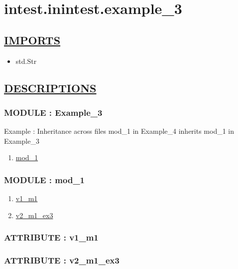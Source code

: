 \chapter*{intest.inintest.example\_3}

\section*{\underline{IMPORTS}}
\begin{itemize}
\item std.Str
\end{itemize}

\section*{\underline{DESCRIPTIONS}}
\subsection*{MODULE : Example\_3}
\hypertarget{ecldoc:intest.inintest.example_3_intest.inintest.Example_3}{}
Example : Inheritance across files mod\_1 in Example\_4 inherits mod\_1 in Example\_3 \\
\begin{enumerate}
\item \hyperlink{ecldoc:intest.inintest.example_3_intest.inintest.Example_3.mod_1}{mod\_1}
\end{enumerate}
\subsection*{MODULE : mod\_1}
\hypertarget{ecldoc:intest.inintest.example_3_intest.inintest.Example_3.mod_1}{}
\begin{enumerate}
\item \hyperlink{ecldoc:intest.inintest.example_3_intest.inintest.example_3.mod_1.v1_m1}{v1\_m1}
\item \hyperlink{ecldoc:intest.inintest.example_3_intest.inintest.example_3.mod_1.v2_m1_ex3}{v2\_m1\_ex3}
\end{enumerate}
\subsection*{ATTRIBUTE : v1\_m1}
\hypertarget{ecldoc:intest.inintest.example_3_intest.inintest.example_3.mod_1.v1_m1}{}
\subsection*{ATTRIBUTE : v2\_m1\_ex3}
\hypertarget{ecldoc:intest.inintest.example_3_intest.inintest.example_3.mod_1.v2_m1_ex3}{}


